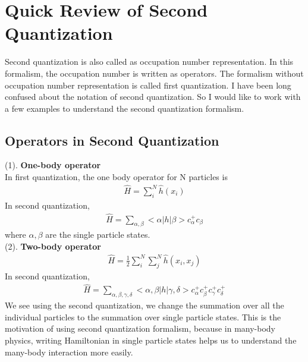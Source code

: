 \documentclass[a4paper]{article}
\begin{document}
\section{Quick Review of Second Quantization}
Second quantization is also called as occupation number representation. In this formalism, the occupation number is written as operators. The formalism without occupation number representation is called first quantization. I have been long confused about the notation of second quantization. So I would like to work with a few examples to understand the second quantization formalism.\\
\subsection{Operators in Second Quantization}
(1). {\bf One-body operator}\\
In first quantization, the one body operator for N particles is
\begin{align*}
	\hat H = \sum_i^N \hat h(x_i)
\end{align*}
In second quantization,
\begin{align*}
	\hat H = \sum_{\alpha,\beta} <\alpha | h | \beta> c^{+}_{\alpha} c_{\beta}
\end{align*}
where $\alpha, \beta$ are the single particle states.\\
(2). {\bf Two-body operator}\\
\begin{align*}
	\hat H = \frac{1}{2}\sum_{i}^N \sum_{j}^{N} \hat h(x_i, x_j)
\end{align*}
In second quantization,
\begin{align*}
	\hat H = \sum_{\alpha,\beta, \gamma, \delta} <\alpha, \beta | h | \gamma, \delta> 
	c^{+}_{\alpha} c^{+}_{\beta} c^{+}_{\gamma} c^{+}_{\delta}
\end{align*}
We see using the second quantization, we change the summation over all the individual particles to the summation over single particle states. This is the motivation of using second quantization formalism, because in many-body physics, writing Hamiltonian in single particle states helps us to understand the many-body interaction more easily.
\end{document}
